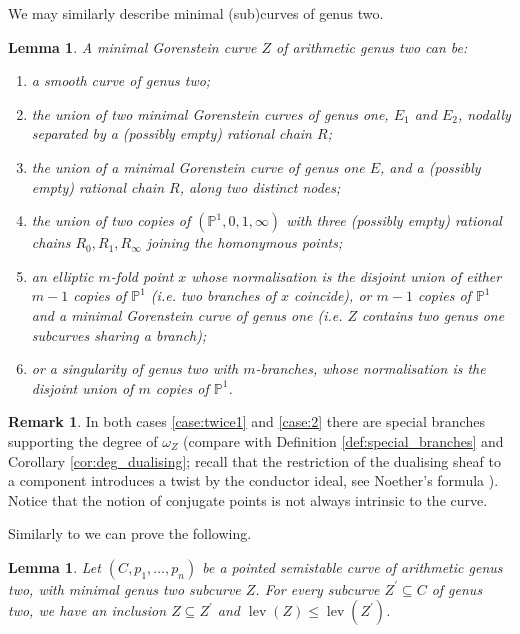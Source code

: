 \documentclass[11pt]{amsart}
\newcommand{\PP}{\mathbb P}
\newcommand{\lev}{\operatorname{lev}}
\theoremstyle{plain}
\newtheorem{lem}[thm]{Lemma}
\theoremstyle{definition}
\newtheorem{rem}[thm]{Remark}
\begin{document}
We may similarly describe minimal (sub)curves of genus two.
\begin{lem}\label{lem:min2}
 A minimal Gorenstein curve $Z$ of arithmetic genus two can be:
 \begin{enumerate}
  \item a smooth curve of genus two;
  \item the union of two minimal Gorenstein curves of genus one, $E_1$ and $E_2$, nodally separated by a (possibly empty) rational chain $R$;
  \item the union of a minimal Gorenstein curve of genus one $E$, and a (possibly empty) rational chain $R$, along two distinct nodes;
  \item the union of two copies of $(\PP^1,0,1,\infty)$ with three (possibly empty) rational chains $R_0, R_1, R_\infty$ joining the homonymous points;
  \item\label{case:twice1} an elliptic $m$-fold point $x$ whose normalisation is the disjoint union of either $m-1$ copies of $\PP^1$ (i.e. two branches of $x$ coincide), or $m-1$ copies of $\PP^1$ and a minimal Gorenstein curve of genus one (i.e. $Z$ contains two genus one subcurves sharing a branch);
  \item\label{case:2} or a singularity of genus two with $m$-branches, whose normalisation is the disjoint union of $m$ copies of $\PP^1$.
 \end{enumerate}

\end{lem}
\begin{rem}\label{rem:special}
In both cases \eqref{case:twice1} and \eqref{case:2} there are special branches supporting the degree of $\omega_Z$ (compare with Definition \ref{def:special_branches} and Corollary \ref{cor:deg_dualising}; recall that the restriction of the dualising sheaf to a component introduces a twist by the conductor ideal, see Noether's formula \cite[Proposition 1.2]{Catanese}). Notice that the notion of conjugate points is not always intrinsic to the curve.\end{rem}

Similarly to \cite[Corollary 3.2, Lemma 3.5]{SMY1} we can prove the following.
\begin{lem}
 Let $(C,p_1,\ldots,p_n)$ be a pointed \emph{semistable} curve of arithmetic genus two, with minimal genus two subcurve $Z$. For every subcurve $Z^\prime\subseteq C$ of genus two, we have an inclusion $Z\subseteq Z^\prime$ and $\lev(Z)\leq\lev(Z^\prime)$.
\end{lem}
\end{document}
